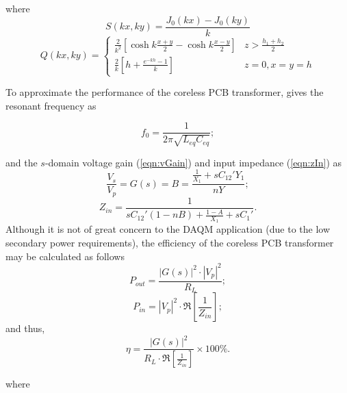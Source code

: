 \documentclass[conference]{IEEEtran}
\begin{document}
\hspace{-20pt} where
\begin{equation}
	S(kx, ky) = \frac{J_{0}(kx) - J_{0}(ky)}{k}
\end{equation}
%
\begin{equation}
	Q(kx, ky) = \left\{
		\begin{array}{lr}
		\frac{2}{k^{2}} \left[ \cosh{k\frac{x+y}{2}}-\cosh{k\frac{x-y}{2}} \right] & z>\frac{h_{1}+h_{2}}{2} \\
		\frac{2}{k} \left[ h+\frac{e^{-kh}-1}{k} \right] & z=0, x=y=h
		\end{array}
   \right.
\end{equation}

\hspace{-20pt} To approximate the performance of the coreless PCB transformer, \cite{TangHuiFundamental} gives the resonant frequency as

\begin{equation}
	f_{0} = \frac{1}{2\pi\sqrt{L_{eq}C_{eq}}};
\end{equation}

\hspace{-20pt} and the $s$-domain voltage gain (\ref{eqn:vGain}) and input impedance (\ref{eqn:zIn}) as
%
\begin{equation}
	\label{eqn:vGain}
	\frac{V_{s}}{V_{p}} = G(s) = B = \frac{\frac{1}{X_{1}}+sC_{12}'Y_{1}}{nY};
\end{equation}
%
\begin{equation}
	\label{eqn:zIn}
	Z_{in} = \frac{1}{sC_{12}'(1-nB)+\frac{1-A}{X_{1}}+sC_{1}'}.
\end{equation}
%
Although it is not of great concern to the DAQM application (due to the low secondary power requirements), the efficiency of the coreless PCB transformer may be calculated as follows
\begin{equation}
	P_{out} = \frac{|G(s)|^{2}\cdot|V_{p}|^{2}}{R_{L}};
\end{equation}
\begin{equation}
	P_{in} = |V_{p}|^{2}\cdot\Re \left[ \frac{1}{Z_{in}} \right];
\end{equation}
and thus, \\
\begin{equation}
	\eta = \frac{|G(s)|^{2}}{R_{L}\cdot\Re \left[ \frac{1}{Z_{in}} \right]}\times 100 \%.
\end{equation}

\hspace{-20pt} where \\
\end{document}
